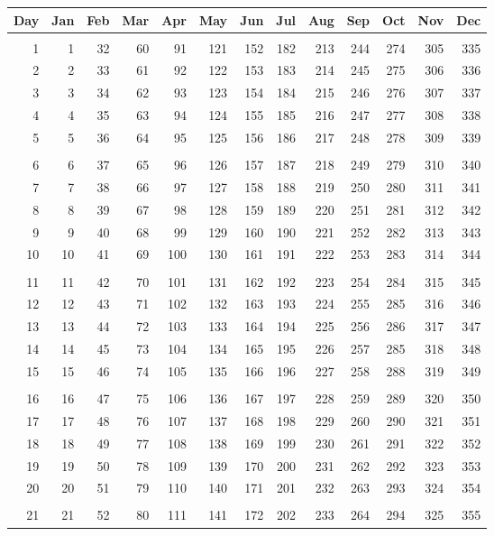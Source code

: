 \newpage
\begin{table}[h]\centering
\begin{tabular}{r|rrrrrrrrrrrr}
Day & Jan & Feb & Mar & Apr & May & Jun & Jul & Aug & Sep & Oct& Nov & Dec\\\hline
&&&&&&&&&&&&\\[-1.5ex]
1 & 1 & 32 & 60 & 91 & 121& 152 & 182& 213& 244 & 274& 305& 335\\
2 & 2 & 33 & 61 & 92 & 122& 153& 183& 214& 245& 275& 306& 336\\
3 & 3&34 & 62& 93& 123& 154& 184& 215& 246& 276& 307& 337\\
4& 4& 35& 63& 94& 124& 155& 185& 216& 247& 277& 308& 338\\
5& 5&36& 64& 95& 125& 156& 186& 217& 248& 278& 309& 339\\
&&&&&&&&&&&&\\
6&6& 37& 65& 96& 126& 157& 187& 218& 249& 279& 310& 340\\
7&7 & 38 & 66 & 97& 127& 158& 188& 219& 250& 280& 311& 341\\
8& 8&39& 67& 98& 128& 159& 189& 220&251& 281& 312& 342\\
9&9&40&68&99&129& 160& 190& 221& 252& 282& 313& 343\\
10&10&41&69&100&130& 161& 191& 222& 253& 283&314&344\\
&&&&&&&&&&&&\\
11&11&42&70& 101& 131& 162& 192& 223& 254& 284& 315& 345\\
12& 12&43&71&102& 132& 163& 193& 224& 255& 285& 316& 346\\
13& 13& 44& 72& 103& 133&164& 194& 225& 256& 286& 317& 347\\
14& 14&45& 73& 104& 134& 165& 195& 226& 257& 285& 318& 348\\
15&15&46& 74& 105& 135& 166& 196& 227& 258& 288& 319& 349\\
&&&&&&&&&&&&\\
16& 16& 47& 75& 106& 136& 167& 197& 228& 259& 289& 320& 350\\
17& 17 & 48& 76& 107& 137& 168& 198& 229& 260& 290& 321& 351\\
18& 18& 49& 77& 108&138& 169& 199& 230& 261& 291& 322& 352\\
19& 19& 50& 78& 109& 139&170& 200& 231& 262& 292& 323& 353\\
20 & 20& 51& 79& 110& 140& 171& 201& 232& 263& 293& 324& 354\\
&&&&&&&&&&&&\\
21 & 21 & 52 & 80 & 111& 141& 172& 202& 233& 264& 294& 325& 355\\

\end{tabular}
\end{table}
